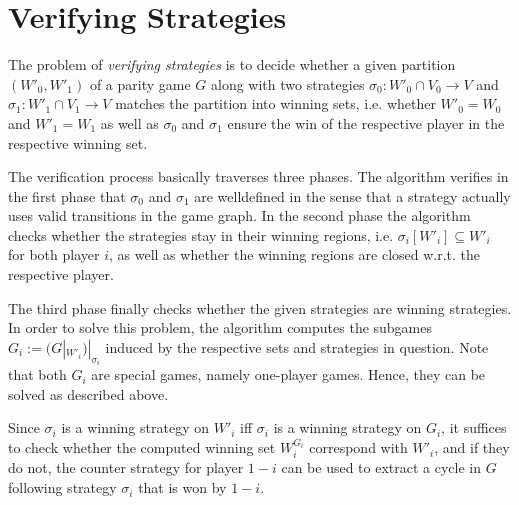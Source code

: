 \section{Verifying Strategies}

The problem of \emph{verifying strategies} is to decide whether a given partition $(W'_0, W'_1)$ of a parity 
game $G$ along with two strategies $\sigma_0: W'_0 \cap V_0 \rightarrow V$ and 
$\sigma_1: W'_1 \cap V_1 \rightarrow V$ matches the partition into winning sets, i.e. whether $W'_0 = W_0$ 
and $W'_1 = W_1$ as well as $\sigma_0$ and $\sigma_1$ ensure the win of the respective player in the 
respective winning set.

The verification process basically traverses three phases. The algorithm verifies in the first phase that 
$\sigma_0$ and $\sigma_1$ are welldefined in the sense that a strategy actually uses valid transitions in 
the game graph. In the second phase the algorithm checks whether the strategies stay in their winning 
regions, i.e. $\sigma_i[W'_i] \subseteq W'_i$ for both player $i$, as well as whether the winning regions 
are closed w.r.t. the respective player.

The third phase finally checks whether the given strategies are winning strategies. In order to solve this 
problem, the algorithm computes the subgames $G_i := (G|_{W'_i})|_{\sigma_i}$ induced by the respective sets 
and strategies in question. Note that both $G_i$ are special games, namely one-player games. Hence, they
can be solved as described above.

Since $\sigma_i$ is a winning strategy on $W'_i$ iff $\sigma_i$ is a winning strategy on $G_i$, it suffices 
to check whether the computed winning set $W^{G_i}_i$ correspond with 
$W'_i$, and if they do not, the counter strategy for player $1 - i$ can be used to extract a cycle in $G$ 
following strategy $\sigma_i$ that is won by $1-i$.




